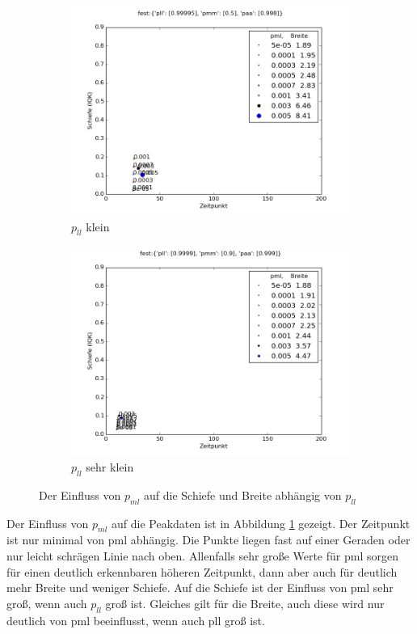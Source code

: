 \begin{figure}
\begin{subfigure}[b]{0.5\textwidth}
\includegraphics[width=\textwidth]{bilder/pml/pml_05_p_0998_099995}
\caption{$p_{ll}$ klein}
\end{subfigure}
\begin{subfigure}[b]{0.5\textwidth}
\includegraphics[width=\textwidth]{bilder/pml/pml_09_p_0999_09999}
\caption{$p_{ll}$ sehr klein}
\end{subfigure}
\caption{Der Einfluss von $p_{ml}$ auf die Schiefe und Breite abhängig von $p_{ll}$}
\label{einfluss_pml_1}
\end{figure}

Der Einfluss von $p_{ml}$ auf die Peakdaten ist in Abbildung \ref{einfluss_pml_1} gezeigt. Der Zeitpunkt ist nur minimal von pml abhängig. Die Punkte liegen fast auf einer Geraden oder nur leicht schrägen Linie nach oben. Allenfalls sehr große Werte für pml sorgen für einen deutlich erkennbaren höheren Zeitpunkt, dann aber auch für deutlich mehr Breite und weniger Schiefe.
Auf die Schiefe ist der Einfluss von pml sehr groß, wenn auch $p_{ll}$ groß ist. Gleiches gilt für die Breite, auch diese wird nur deutlich von pml beeinflusst, wenn auch pll groß ist. 

